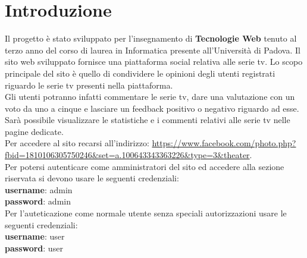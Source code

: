 \newpage
\section{Introduzione}
Il progetto è stato sviluppato per l'insegnamento di \textbf{\normalsize{Tecnologie Web}} tenuto al terzo anno del corso di laurea in Informatica presente all'Università di Padova. Il sito web sviluppato fornisce una piattaforma social relativa alle serie tv. Lo scopo principale del sito è quello di condividere le opinioni degli utenti registrati riguardo le serie tv presenti nella piattaforma.\\
Gli utenti potranno infatti commentare le serie tv, dare una valutazione con un voto da uno a cinque e lasciare un feedback positivo o negativo riguardo ad esse.\\
Sarà possibile visualizzare le statistiche e i commenti relativi alle serie tv nelle pagine dedicate.\\

Per accedere al sito recarsi all'indirizzo: \url{https://www.facebook.com/photo.php?fbid=1810106305750246&set=a.100643343363226&type=3&theater}.~\\

Per potersi autenticare come amministratori del sito ed accedere 
alla sezione riservata si devono usare le seguenti credenziali: \\
\enspace \textbf{username}: admin\\ 
\enspace \textbf{password}: admin \\

Per l'auteticazione come normale utente senza speciali autorizzazioni usare le seguenti credenziali:\\
\enspace \textbf{username}: user\\ 
\enspace \textbf{password}: user \\
